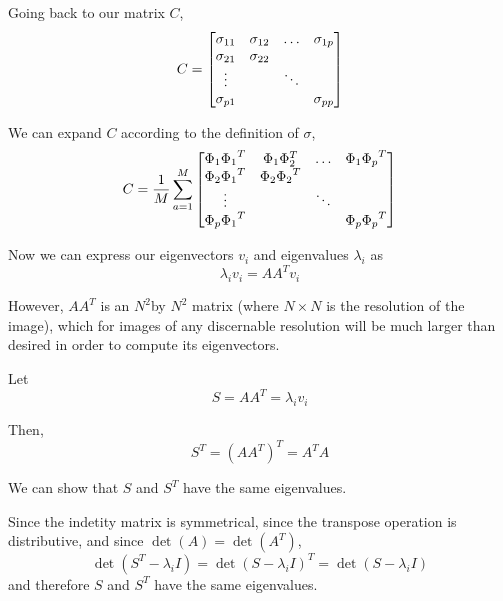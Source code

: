 \documentclass[12pt]{report}
\begin{document}
            Going back to our matrix $C$,
                \[
                    C = \begin{bmatrix}
                        \sigma_{11} & \sigma_{12} & \dots  & \sigma_{1p} \\
                        \sigma_{21} & \sigma_{22} &        &             \\
                        \vdots      &             & \ddots &             \\
                        \sigma_{p1} &             &        & \sigma_{pp}
                    \end{bmatrix}
                \]
    
             We can expand $C$ according to the definition of $\sigma$,
                \[
                    C = \frac{1}{M} \sum_{a=1}^M \begin{bmatrix}
                        \Phi_1 {\Phi_1}^T & \Phi_1 \Phi_2^T   & \dots  & \Phi_1 {\Phi_p}^T \\
                        \Phi_2 {\Phi_1}^T & \Phi_2 {\Phi_2}^T &        &                   \\
                        \vdots            &                   & \ddots &                   \\
                        \Phi_p {\Phi_1}^T &                   &        & \Phi_p {\Phi_p}^T
                    \end{bmatrix}
                \]
        
            
            Now we can express our eigenvectors $v_{i}$ and eigenvalues $\lambda _{i}$ as
                \[
                    \lambda_i v_i = A A^T v_i
                \]
    
            However, $A A^T$ is an $N^2$by $N^2$ matrix (where $N \times N$ is the resolution of the image), which for images of any discernable resolution will be much larger than desired in order to compute its eigenvectors. 
            
            Let
                \[
                    S = A A^T = \lambda_i v_i
                \]
    
            Then,
                \[
                    S^T = \left(A A^T\right)^T = A^T A
                \]
    
            We can show that $S$ and $S^{T}$ have the same eigenvalues. 
            
            Since the indetity matrix is symmetrical, since the transpose operation is distributive, and since $\det(A) = \det\left(A^T\right)$,
                \[
                    \det\left(S^T - \lambda_i I\right) = \det(S - \lambda_i I)^T = \det(S - \lambda_i I)
                \]
            and therefore $S$ and $S^T$ have the same eigenvalues.
            
\end{document}
